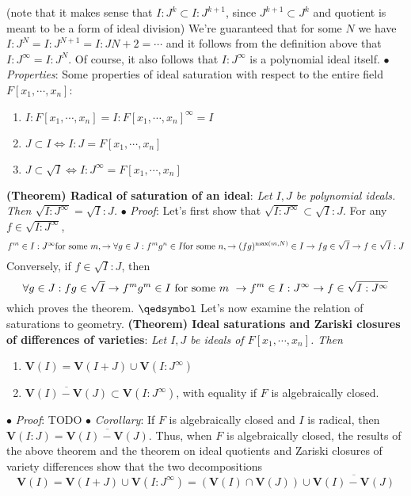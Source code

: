 \documentclass{article}
\newcommand*{\tb}{\textbf}
\newcommand*{\ti}{\textit}
\newcommand*{\n}{\newline}
\newcommand*{\nn}{\newline \newline}
\newcommand*{\Fx}{\ensuremath{F[x_1, \cdots, x_n]}}
\newcommand*{\V}{\ensuremath{\mathbf{V}}}
\begin{document}
(note that it makes sense that $ I : J^k \subset I : J^{k + 1} $, since $ J^{k + 1} \subset J^k $ and quotient is meant to be a form of ideal division) We're guaranteed that for some $ N $ we have $ I : J^N = I : J^{N + 1} = I : J{N + 2} = \cdots $ and it follows from the definition above that $ I : J^\infty = I : J^N $. Of course, it also follows that $ I : J^\infty $ is a polynomial ideal itself.
\n
\indent $ \bullet $ \ti{Properties}: Some properties of ideal saturation with respect to the entire field $ \Fx $:
\begin{enumerate}
    \item $ I : \Fx = I : \Fx^\infty = I $
    \item $ J \subset I \iff I : J = \Fx $
    \item $ J \subset \sqrt{I} \iff I : J^\infty = \Fx $
\end{enumerate}
\tb{(Theorem) Radical of saturation of an ideal}: \ti{Let $ I, J $ be polynomial ideals. Then $ \sqrt{I : J^\infty} = \sqrt{I} : J $.}
\n
\indent $ \bullet $ \ti{Proof}: Let's first show that $ \sqrt{I : J^\infty} \subset \sqrt{I} : J $. For any $ f \in \sqrt{I : J^\infty} $,
$$ f^m \in I : J^\infty \text{for some $ m $}, \rightarrow \forall g \in J: f^m g^n \in I \text{for some $ n $}, \rightarrow (f g)^{\max(m, N)} \in I \rightarrow f g \in \sqrt{I} \rightarrow f \in \sqrt{I} : J $$ 
Conversely, if $ f \in \sqrt{I} : J $, then 
$$ \forall g \in J: f g \in \sqrt{I} \rightarrow f^m g^m \in I \text{ for some $ m $ } \rightarrow f^m \in I : J^\infty \rightarrow f \in \sqrt{I : J^\infty} $$
which proves the theorem. $ \qedsymbol $
\nn
Let's now examine the relation of saturations to geometry.
\nn
\tb{(Theorem) Ideal saturations and Zariski closures of differences of varieties}: \ti{Let $ I, J $ be ideals of $ \Fx $. Then}
\begin{enumerate}
    \item $ \V(I) = \V(I + J) \cup \V(I : J^\infty) $
    \item $ \overline{\V(I) - \V(J)} \subset \V(I : J^\infty) $, with equality if $ F $ is algebraically closed.
\end{enumerate}
\indent $ \bullet $ \ti{Proof}: TODO
\n
\indent $ \bullet $ \ti{Corollary}: If $ F $ is algebraically closed and $ I $ is radical, then $ \V(I : J) = \overline{\V(I) - \V(J)} $.
\nn
Thus, when $ F $ is algebraically closed, the results of the above theorem and the theorem on ideal quotients and Zariski closures of variety differences show that the two decompositions
$$ \V(I) = \V(I + J) \cup \V(I : J^\infty) = (\V(I) \cap \V(J)) \cup \overline{\V(I) - \V(J)} $$
\end{document}
